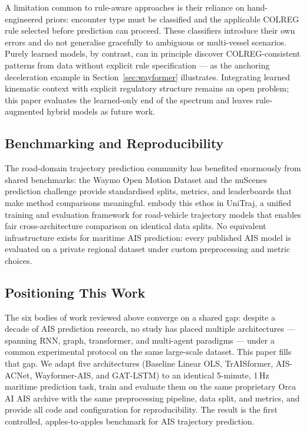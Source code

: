 \documentclass[12pt, a4paper]{article}
\begin{document}
  A limitation common to rule-aware approaches is their reliance on
  hand-engineered priors: encounter type must be classified and the applicable
  COLREG rule selected before prediction can proceed.  These classifiers introduce
  their own errors and do not generalise gracefully to ambiguous or multi-vessel
  scenarios.  Purely learned models, by contrast, can in principle discover
  COLREG-consistent patterns from data without explicit rule specification --- as
  the anchoring deceleration example in Section~\ref{sec:wayformer} illustrates.
  Integrating learned kinematic context with explicit regulatory structure remains
  an open problem; this paper evaluates the learned-only end of the spectrum and
  leaves rule-augmented hybrid models as future work.

  \subsection{Benchmarking and Reproducibility}

  The road-domain trajectory prediction community has benefited enormously from
  shared benchmarks: the Waymo Open Motion Dataset and the nuScenes prediction
  challenge provide standardised splits, metrics, and leaderboards that make
  method comparisons meaningful.  \citet{feng2024unitraj} embody this ethos in
  UniTraj, a unified training and evaluation framework for road-vehicle trajectory
  models that enables fair cross-architecture comparison on identical data splits.
  No equivalent infrastructure exists for maritime AIS prediction: every published
  AIS model is evaluated on a private regional dataset under custom preprocessing
  and metric choices.

  \subsection{Positioning This Work}

  The six bodies of work reviewed above converge on a shared gap: despite a decade
  of AIS prediction research, no study has placed multiple architectures ---
  spanning RNN, graph, transformer, and multi-agent paradigms --- under a common
  experimental protocol on the same large-scale dataset.  This paper fills that
  gap.  We adapt five architectures (Baseline Linear OLS, TrAISformer, AIS-ACNet,
  Wayformer-AIS, and GAT-LSTM) to an identical 5-minute, 1\,Hz maritime prediction
  task, train and evaluate them on the same proprietary Orca AI AIS archive with
  the same preprocessing pipeline, data split, and metrics, and provide all code
  and configuration for reproducibility.  The result is the first controlled,
  apples-to-apples benchmark for AIS trajectory prediction.
\end{document}
